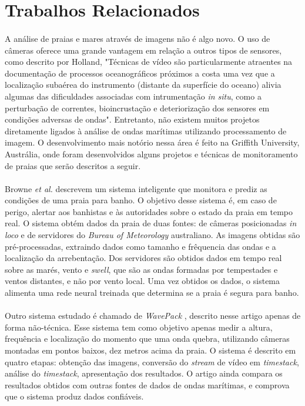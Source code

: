 \section{Trabalhos Relacionados}
\paragraph{}A análise de praias e mares através de imagens não é algo novo. O uso de câmeras oferece uma grande vantagem em relação a outros tipos de sensores, como descrito por Holland\cite{Holland97}, "Técnicas de vídeo são particularmente atraentes na documentação de processos oceanográficos próximos a costa uma vez que a localização subaérea do instrumento (distante da superfície do oceano) alivia algumas das dificuldades associadas com intrumentação \textit{in situ}, como a perturbação de correntes, bioincrustação e deteriorização dos sensores em condições adversas de ondas". Entretanto, não existem muitos projetos diretamente ligados à análise de ondas marítimas utilizando processamento de imagem. O desenvolvimento mais notório nessa área é feito na Griffith University, Austrália, onde foram desenvolvidos alguns projetos e técnicas de monitoramento de praias que serão descritos a seguir. 
\paragraph{}Browne \textit{et al.} \cite{Griffith05} descrevem um sistema inteligente que monitora e prediz as condições de uma praia para banho. O objetivo desse sistema é, em caso de perigo, alertar aos banhistas e às autoridades sobre o estado da praia em tempo real. O sistema obtém dados da praia de duas fontes: de câmeras posicionadas \textit{in loco} e de servidores do \textit{Bureau of Meteorology} australiano.
As imagens obtidas são pré-processadas, extraindo dados como tamanho e frêquencia das ondas e a localização da arrebentação. Dos servidores são obtidos dados em tempo real sobre as marés, vento e \textit{swell}, que são as ondas formadas por tempestades e ventos distantes, e não por vento local. Uma vez obtidos os dados, o sistema alimenta uma rede neural treinada que determina se a praia é segura para banho.
\paragraph{}Outro sistema estudado é chamado de \textit{WavePack} \cite{Griffith10}, descrito nesse artigo apenas de forma não-técnica. Esse sistema tem como objetivo apenas medir a altura, frequência e localização do momento que uma onda quebra, utilizando câmeras montadas em pontos baixos, dez metros acima da praia. O sistema é descrito em quatro etapas: obtenção das imagens, conversão do \textit{stream} de vídeo em \textit{timestack}, análise do \textit{timestack}, apresentação dos resultados. O artigo ainda compara os resultados obtidos com outras fontes de dados de ondas marítimas, e comprova que o sistema produz dados confiáveis. 
